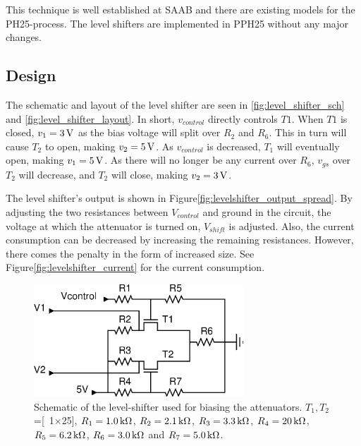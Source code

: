 		This technique is well established at SAAB and there are existing models for the PH25-process.\autocite{gustavsson07} The level shifters are implemented in PPH25 without any major changes.
		
	\subsection{Design}
		The schematic and layout of the level shifter are seen in \autoref{fig:level_shifter_sch} and \autoref{fig:level_shifter_layout}.
		In short, $v_{control}$  directly controls $T1$. When $T1$ is closed, $v_1=\unit[3]{V}$ as the bias voltage will split over $R_2$ and $R_6$. This in turn will cause $T_2$ to open, making  $v_2=\unit[5]{V}$. As $v_{control}$ is decreased, $T_1$ will eventually open, making $v_1=\unit[5]{V}$. As there will no longer be any current over $R_6$, $v_{gs}$ over $T_2$ will decrease, and $T_2$ will close, making $v_2=\unit[3]{V}$.
		
		The level shifter's output is shown in Figure\autoref{fig:levelshifter_output_spread}. By adjusting the two resistances between $V_{control}$ and ground in the circuit, the voltage at which the attenuator is turned on, $V_{shift}$ is adjusted. Also, the current consumption can be decreased by increasing the remaining resistances. However, there comes the penalty in the form of increased size. See Figure\autoref{fig:levelshifter_current} for the current consumption.


		\begin{figure}[h!]
			\centering
			\includegraphics[width=0.7\textwidth]{fig/attenuators/sch_level_shifter}
			\caption[Level-shifter schematic layout]{Schematic of the level-shifter used for biasing the attenuators. $T_1,T_2$=\unit[1$\times$25]{\mum}, $R_1=\unit[1.0]{k\Omega}$, $R_2=\unit[2.1]{k\Omega}$, $R_3=\unit[3.3]{k\Omega}$, $R_4=\unit[20]{k\Omega}$, $R_5=\unit[6.2]{k\Omega}$, $R_6=\unit[3.0]{k\Omega}$ and $R_7=\unit[5.0]{k\Omega}$.}\label{fig:level_shifter_sch}
		\end{figure}
		
